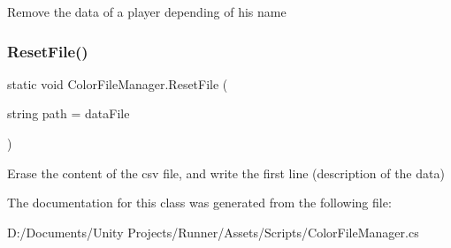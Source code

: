 Remove the data of a player depending of his name \mbox{\label{class_color_file_manager_aa6497a46c4128d159552b65f1f675cfe}} 
\subsubsection{\texorpdfstring{Reset\+File()}{ResetFile()}}
{\footnotesize\ttfamily static void Color\+File\+Manager.\+Reset\+File (\begin{DoxyParamCaption}\item[{string}]{path = {\ttfamily dataFile} }\end{DoxyParamCaption})\hspace{0.3cm}{\ttfamily [static]}}

Erase the content of the csv file, and write the first line (description of the data) 

The documentation for this class was generated from the following file\+:\begin{DoxyCompactItemize}
\item 
D\+:/\+Documents/\+Unity Projects/\+Runner/\+Assets/\+Scripts/Color\+File\+Manager.\+cs\end{DoxyCompactItemize}
